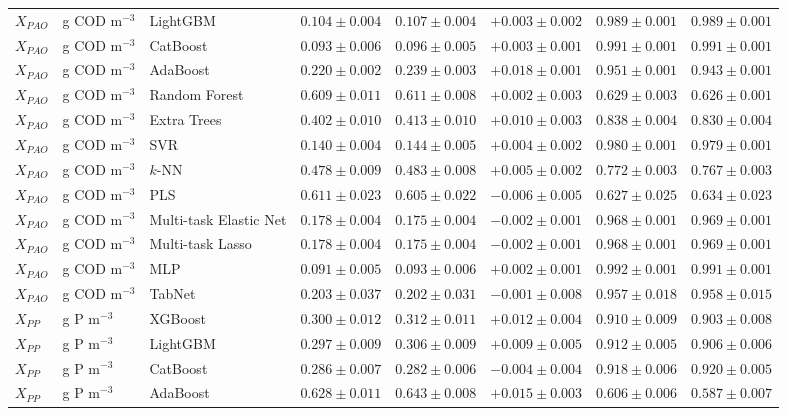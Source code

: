 \begin{longtable}{llp{3.1cm}rrrrr}
$X_{PAO}$ & g COD m$^{-3}$ & LightGBM & $0.104\pm0.004$ & $0.107\pm0.004$ & $+0.003\pm0.002$ & $0.989\pm0.001$ & $0.989\pm0.001$ \\
$X_{PAO}$ & g COD m$^{-3}$ & CatBoost & $0.093\pm0.006$ & $0.096\pm0.005$ & $+0.003\pm0.001$ & $0.991\pm0.001$ & $0.991\pm0.001$ \\
$X_{PAO}$ & g COD m$^{-3}$ & AdaBoost & $0.220\pm0.002$ & $0.239\pm0.003$ & $+0.018\pm0.001$ & $0.951\pm0.001$ & $0.943\pm0.001$ \\
$X_{PAO}$ & g COD m$^{-3}$ & Random Forest & $0.609\pm0.011$ & $0.611\pm0.008$ & $+0.002\pm0.003$ & $0.629\pm0.003$ & $0.626\pm0.001$ \\
$X_{PAO}$ & g COD m$^{-3}$ & Extra Trees & $0.402\pm0.010$ & $0.413\pm0.010$ & $+0.010\pm0.003$ & $0.838\pm0.004$ & $0.830\pm0.004$ \\
$X_{PAO}$ & g COD m$^{-3}$ & SVR & $0.140\pm0.004$ & $0.144\pm0.005$ & $+0.004\pm0.002$ & $0.980\pm0.001$ & $0.979\pm0.001$ \\
$X_{PAO}$ & g COD m$^{-3}$ & $k$-NN & $0.478\pm0.009$ & $0.483\pm0.008$ & $+0.005\pm0.002$ & $0.772\pm0.003$ & $0.767\pm0.003$ \\
$X_{PAO}$ & g COD m$^{-3}$ & PLS & $0.611\pm0.023$ & $0.605\pm0.022$ & $-0.006\pm0.005$ & $0.627\pm0.025$ & $0.634\pm0.023$ \\
$X_{PAO}$ & g COD m$^{-3}$ & Multi-task Elastic Net & $0.178\pm0.004$ & $0.175\pm0.004$ & $-0.002\pm0.001$ & $0.968\pm0.001$ & $0.969\pm0.001$ \\
$X_{PAO}$ & g COD m$^{-3}$ & Multi-task Lasso & $0.178\pm0.004$ & $0.175\pm0.004$ & $-0.002\pm0.001$ & $0.968\pm0.001$ & $0.969\pm0.001$ \\
$X_{PAO}$ & g COD m$^{-3}$ & MLP & $0.091\pm0.005$ & $0.093\pm0.006$ & $+0.002\pm0.001$ & $0.992\pm0.001$ & $0.991\pm0.001$ \\
$X_{PAO}$ & g COD m$^{-3}$ & TabNet & $0.203\pm0.037$ & $0.202\pm0.031$ & $-0.001\pm0.008$ & $0.957\pm0.018$ & $0.958\pm0.015$ \\
$X_{PP}$ & g P m$^{-3}$ & XGBoost & $0.300\pm0.012$ & $0.312\pm0.011$ & $+0.012\pm0.004$ & $0.910\pm0.009$ & $0.903\pm0.008$ \\
$X_{PP}$ & g P m$^{-3}$ & LightGBM & $0.297\pm0.009$ & $0.306\pm0.009$ & $+0.009\pm0.005$ & $0.912\pm0.005$ & $0.906\pm0.006$ \\
$X_{PP}$ & g P m$^{-3}$ & CatBoost & $0.286\pm0.007$ & $0.282\pm0.006$ & $-0.004\pm0.004$ & $0.918\pm0.006$ & $0.920\pm0.005$ \\
$X_{PP}$ & g P m$^{-3}$ & AdaBoost & $0.628\pm0.011$ & $0.643\pm0.008$ & $+0.015\pm0.003$ & $0.606\pm0.006$ & $0.587\pm0.007$ \\

\end{longtable}
